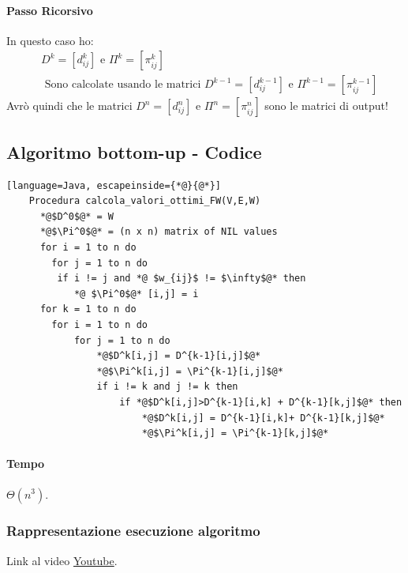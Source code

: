 \paragraph*{Passo Ricorsivo} In questo caso ho:
\begin{align*}
    &D^k=[d^k_{ij}] \text{ e } \Pi^k=[\pi^k_{ij}]\\
    &\text{ Sono calcolate usando le matrici } D^{k-1} = [d^{k-1}_{ij}] \text{ e }
    \Pi^{k-1} = [\pi^{k-1}_{ij}]
\end{align*}
Avrò quindi che le matrici $D^n = [d^n_{ij}]$ e $\Pi^n = [\pi^n_{ij}]$ sono le matrici di
output!
\subsection{Algoritmo bottom-up - Codice}
\begin{lstlisting}[language=Java, escapeinside={*@}{@*}]
    Procedura calcola_valori_ottimi_FW(V,E,W)
      *@$D^0$@* = W
      *@$\Pi^0$@* = (n x n) matrix of NIL values
      for i = 1 to n do
        for j = 1 to n do
         if i != j and *@ $w_{ij}$ != $\infty$@* then
            *@ $\Pi^0$@* [i,j] = i
      for k = 1 to n do
        for i = 1 to n do
            for j = 1 to n do
                *@$D^k[i,j] = D^{k-1}[i,j]$@*
                *@$\Pi^k[i,j] = \Pi^{k-1}[i,j]$@*
                if i != k and j != k then
                    if *@$D^k[i,j]>D^{k-1}[i,k] + D^{k-1}[k,j]$@* then
                        *@$D^k[i,j] = D^{k-1}[i,k]+ D^{k-1}[k,j]$@*
                        *@$\Pi^k[i,j] = \Pi^{k-1}[k,j]$@*
\end{lstlisting}
\paragraph*{Tempo} $\Theta(n^3)$.
\subsubsection*{Rappresentazione esecuzione algoritmo}
Link al video \href{https://www.youtube.com/watch?v=4OQeCuLYj-4&ab_channel=MichaelSambol}{Youtube}.